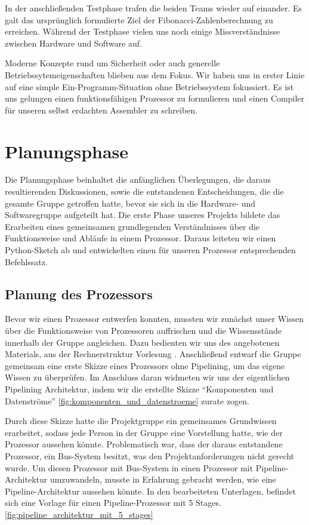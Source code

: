 \documentclass[paper=a4,fontsize=11pt,twocolumn]{scrreprt}
\begin{document}
In der anschließenden Testphase trafen die beiden Teams wieder auf einander.
Es galt das ursprünglich formulierte Ziel der Fibonacci-Zahlenberechnung zu erreichen.
Während der Testphase vielen uns noch einige Missverständnisse zwischen Hardware und Software auf.

Moderne Konzepte rund um Sicherheit oder auch generelle Betriebssytemeigenschaften blieben aus dem Fokus.
Wir haben uns in erster Linie auf eine simple Ein-Programm-Situation ohne Betriebssystem fokussiert.
Es ist uns gelungen einen funktionsfähigen Prozessor zu formulieren und einen Compiler für unseren selbst erdachten Assembler zu schreiben.

\chapter{Planungsphase}
\label{ch:planungsphase}

Die Planungsphase beinhaltet die anfänglichen Überlegungen, die daraus resultierenden Diskussionen, sowie die entstandenen Entscheidungen, die die gesamte Gruppe getroffen hatte, bevor sie sich in die Hardware- und Softwaregruppe aufgeteilt hat.
Die erste Phase unseres Projekts bildete das Erarbeiten eines gemeinsamen grundlegenden Verständnisses über die Funktionsweise und Abläufe in einem Prozessor. 
Daraus leiteten wir einen Python-Sketch ab und entwickelten einen für unseren Prozessor entsprechenden Befehlssatz.

\section{Planung des Prozessors}
\label{sec:planung_des_prozessors}
Bevor wir einen Prozessor entwerfen konnten, mussten wir zunächst unser Wissen über die Funktionsweise von Prozessoren auffrischen und die Wissensstände innerhalb der Gruppe angleichen.
Dazu bedienten wir uns des angebotenen Materials, aus der Rechnerstruktur Vorlesung \textcite{rsvorlesung}.
Anschließend entwarf die Gruppe gemeinsam eine erste Skizze eines Prozessors ohne Pipelining, um das eigene Wissen zu überprüfen.
Im Anschluss daran widmeten wir uns der eigentlichen Pipelining Architektur, indem wir die erstellte Skizze \enquote{Komponenten und Datenströme} \ref{fig:komponenten_und_datenstroeme} zurate zogen.

Durch diese Skizze hatte die Projektgruppe ein gemeinsames Grundwissen erarbeitet, sodass jede Person in der Gruppe eine Vorstellung hatte, wie der Prozessor aussehen könnte.
Problematisch war, dass der daraus entstandene Prozessor, ein Bus-System besitzt, was den Projektanforderungen nicht gerecht wurde.
Um diesen Prozessor mit Bus-System in einen Prozessor mit Pipeline-Architektur umzuwandeln, musste in Erfahrung gebracht werden, wie eine Pipeline-Architektur aussehen könnte.
In den bearbeiteten Unterlagen, befindet sich eine Vorlage für einen Pipeline-Prozessor mit 5 Stages.\ref{fig:pipeline_architektur_mit_5_stages}
\end{document}
